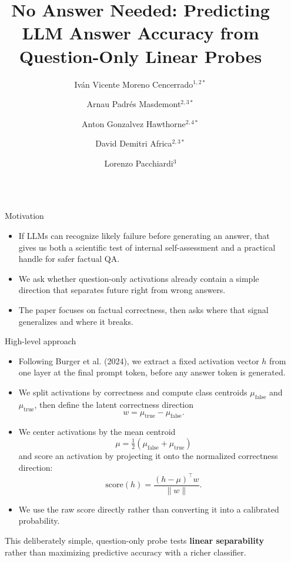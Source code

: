 \documentclass[final]{beamer}
\title{No Answer Needed: Predicting LLM Answer Accuracy from Question-Only Linear Probes}
\author{
Iv\'an Vicente Moreno Cencerrado$^{1,2*}$ \and
Arnau Padr\'es Masdemont$^{2,3*}$ \and
Anton Gonzalvez Hawthorne$^{2,4*}$ \and
David Demitri Africa$^{2,3*}$ \and
Lorenzo Pacchiardi$^{3}$
}
\institute[shortinst]{
$^1$ Universidad Internacional de Valencia \samelineand
$^2$ MARS \samelineand
$^3$ University of Cambridge \samelineand
$^4$ Independent Researcher \samelineand
$^*$ Equal contribution
}
\newlength{\sepwidth}
\newlength{\leftcolwidth}
\newcommand{\separatorcolumn}{\begin{column}{\sepwidth}\end{column}}
\begin{document}
\begin{frame}[t]
\begin{columns}[t]
\separatorcolumn

\begin{column}{\leftcolwidth}

\begin{block}{Motivation}
\begin{itemize}
\item If LLMs can recognize likely failure before generating an answer, that gives us both a scientific test of internal self-assessment and a practical handle for safer factual QA.
\item We ask whether question-only activations already contain a simple direction that separates future right from wrong answers.
\item The paper focuses on factual correctness, then asks where that signal generalizes and where it breaks.
\end{itemize}
\end{block}

\begin{block}{High-level approach}
\begin{itemize}
\item Following Burger et al. (2024), we extract a fixed activation vector \(h\) from one layer at the final prompt token, before any answer token is generated.
\item We split activations by correctness and compute class centroids \(\mu_{\mathrm{false}}\) and \(\mu_{\mathrm{true}}\), then define the latent correctness direction
\[
w = \mu_{\mathrm{true}} - \mu_{\mathrm{false}}.
\]
\item We center activations by the mean centroid
\[
\mu = \tfrac{1}{2}\left(\mu_{\mathrm{false}} + \mu_{\mathrm{true}}\right)
\]
and score an activation by projecting it onto the normalized correctness direction:
\[
\mathrm{score}(h) = \frac{(h-\mu)^\top w}{\lVert w\rVert}.
\]
\item We use the raw score directly rather than converting it into a calibrated probability.
\end{itemize}

This deliberately simple, question-only probe tests \textbf{linear separability} rather than maximizing predictive accuracy with a richer classifier.
\end{block}


\end{column}
\end{columns}
\end{frame}
\end{document}
